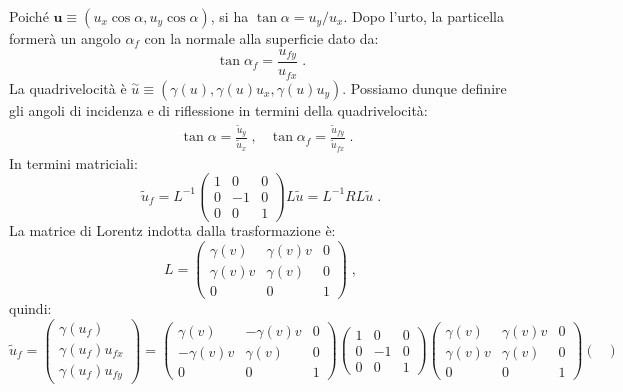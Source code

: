 \begin{enumerate}
Poiché $\mathbf{u}\equiv(u_x\cos\alpha,u_y\cos\alpha)$, si ha $\tan\alpha=u_y/u_x$. Dopo l'urto, la particella formerà un angolo 
$\alpha_f$ con la normale alla superficie dato da:
\begin{equation}
\tan\alpha_f=\frac{u_{fy}}{u_{fx}}\;.
\end{equation}
La quadrivelocità è $\stackrel{\sim}{u}\equiv(\gamma(u),\gamma(u)u_x,\gamma(u)u_y)$. Possiamo dunque definire gli angoli di incidenza e di riflessione in termini della quadrivelocità:
\begin{align}
&\tan\alpha=\frac{\tilde{u}_y}{\tilde{u}_x}\;, &\tan\alpha_f=\frac{\tilde{u}_{fy}}{\tilde{u}_{fx}}\;.
\end{align}
In termini matriciali:
\begin{equation}
\tilde{u}_f=L^{-1}\begin{pmatrix}
1 & 0 & 0 \\
0 & -1 & 0 \\
0 & 0 & 1
\end{pmatrix}L\tilde{u}=L^{-1}RL\tilde{u}\;.
\end{equation}
La matrice di Lorentz indotta dalla trasformazione è:
\begin{equation}
L=\begin{pmatrix}
\gamma(v) & \gamma(v)v & 0 \\
\gamma(v)v & \gamma(v) & 0 \\
0 & 0 & 1
\end{pmatrix}\;,
\end{equation}
quindi:
\begin{equation}
\tilde{u}_f=\begin{pmatrix}
\gamma(u_f) \\
\gamma(u_f)u_{fx} \\
\gamma(u_f)u_{fy}
\end{pmatrix}=\begin{pmatrix}
\gamma(v) & -\gamma(v)v & 0 \\
-\gamma(v)v & \gamma(v) & 0 \\
0 & 0 & 1
\end{pmatrix}\begin{pmatrix}
1 & 0 & 0 \\
0 & -1 & 0 \\
0 & 0 & 1
\end{pmatrix}\begin{pmatrix}
\gamma(v) & \gamma(v)v & 0 \\
\gamma(v)v & \gamma(v) & 0 \\
0 & 0 & 1
\end{pmatrix}\begin{pmatrix}

\end{pmatrix}
\end{equation}
\end{enumerate}
